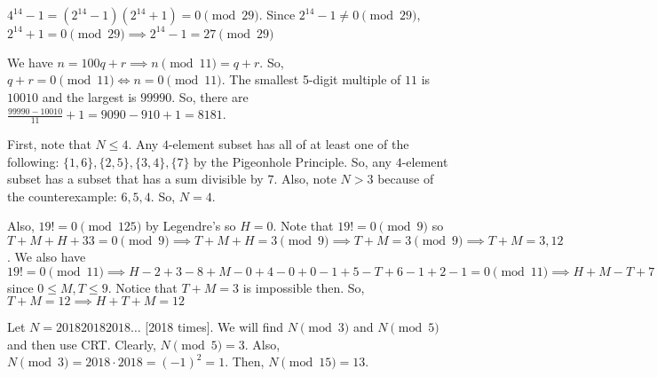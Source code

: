 \documentclass[11pt]{article}
\begin{document}
\begin{sol}
$4^{14}-1=(2^{14}-1)(2^{14}+1)=0\pmod{29}$. Since $2^{14}-1\neq 0 \pmod{29}$, $2^{14}+1=0\pmod{29}\implies 2^{14}-1=\boxed{27}\pmod{29}$
\end{sol}


\begin{sol}
We have $n=100q+r\implies n\pmod{11}=q+r$. So, $q+r=0\pmod{11}\iff n=0\pmod{11}$. The smallest 5-digit multiple of $11$ is $10010$ and the largest is $99990$. So, there are $\frac{99990-10010}{11}+1=9090-910+1=\boxed{8181}$.
\end{sol}


\begin{sol}
First, note that $N\leq 4$. Any $4$-element subset has all of at least one of the following: $\{1,6\},\{2,5\},\{3,4\},\{7\}$ by the Pigeonhole Principle. So, any $4$-element subset has a subset that has a sum divisible by $7$. Also, note $N>3$ because of the counterexample: $6,5,4$. So, $N=\boxed{4}$. 
\end{sol}


\begin{sol}
Also, $19!=0\pmod{125}$ by Legendre's so $H=0$. Note that $19!=0\pmod{9}$ so $T+M+H+33=0\pmod{9}\implies T+M+H=3\pmod{9}\implies T+M=3\pmod{9}\implies T+M=3,12$.  We also have $19!=0\pmod{11}\implies H-2+3-8+M-0+4-0+0-1+5-T+6-1+2-1=0\pmod{11}\implies H+M-T+7=0\pmod{11}\implies H+M-T=4\pmod{11}\implies M-T=4\pmod{11}\implies M-T=4$ since $0\leq M,T\leq 9$. Notice that $T+M=3$ is impossible then. So, $T+M=12\implies H+T+M=\boxed{12}$
\end{sol}


\begin{sol}
Let $N=201820182018\ldots$ [2018 times]. We will find $N\pmod{3}$ and $N\pmod{5}$ and then use CRT. Clearly, $N\pmod{5}=3$. Also, $N\pmod{3}=2018\cdot 2018=(-1)^2=1$. Then, $N\pmod{15}=\boxed{13}$.
\end{sol}
\end{document}
